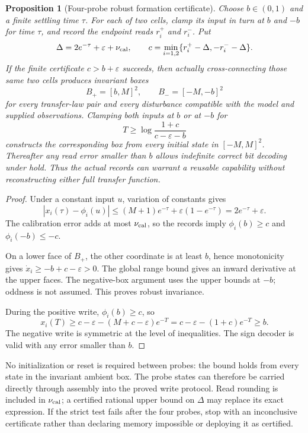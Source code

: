 \documentclass[11pt]{article}
\newtheorem{proposition}[theorem]{Proposition}
\theoremstyle{definition}
\theoremstyle{remark}
\begin{document}
\begin{proposition}[Four-probe robust formation certificate]\label{fb:prop:finite-probes}
Choose $b\in(0,1)$ and a finite settling time $\tau$. For each of two cells, clamp its input in turn at $b$ and $-b$ for time $\tau$, and record the endpoint reads $r_i^+$ and $r_i^-$. Put
\[
 \Delta=2e^{-\tau}+\varepsilon+\nu_{\rm cal},\qquad
 c=\min_{i=1,2}\{r_i^+-\Delta,-r_i^--\Delta\}.
\]
If the finite certificate $c>b+\varepsilon$ succeeds, then actually cross-connecting those same two cells produces invariant boxes
\[
 B_+=[b,M]^2,\qquad B_-=[-M,-b]^2
\]
for every transfer-law pair and every disturbance compatible with the model and supplied observations. Clamping both inputs at $b$ or at $-b$ for
\[
 T\geq\log\frac{1+c}{c-\varepsilon-b}
\]
constructs the corresponding box from every initial state in $[-M,M]^2$. Thereafter any read error smaller than $b$ allows indefinite correct bit decoding under hold. Thus the actual records can warrant a reusable capability without reconstructing either full transfer function.
\end{proposition}
\begin{proof}
Under a constant input $u$, variation of constants gives
\[
 |x_i(\tau)-\phi_i(u)|
 \leq (M+1)e^{-\tau}+\varepsilon(1-e^{-\tau})
 =2e^{-\tau}+\varepsilon.
\]
The calibration error adds at most $\nu_{\rm cal}$, so the records imply
$\phi_i(b)\geq c$ and $\phi_i(-b)\leq-c$.

On a lower face of $B_+$, the other coordinate is at least $b$, hence monotonicity gives
$\dot x_i\geq-b+c-\varepsilon>0$. The global range bound gives an inward derivative at the upper faces. The negative-box argument uses the upper bounds at $-b$; oddness is not assumed. This proves robust invariance.

During the positive write, $\phi_i(b)\geq c$, so
\[
 x_i(T)\geq c-\varepsilon-(M+c-\varepsilon)e^{-T}
 =c-\varepsilon-(1+c)e^{-T}\geq b.
\]
The negative write is symmetric at the level of inequalities. The sign decoder is valid with any error smaller than $b$.
\end{proof}

No initialization or reset is required between probes: the bound holds from every state in the invariant ambient box. The probe states can therefore be carried directly through assembly into the proved write protocol. Read rounding is included in $\nu_{\rm cal}$; a certified rational upper bound on $\Delta$ may replace its exact expression. If the strict test fails after the four probes, stop with an inconclusive certificate rather than declaring memory impossible or deploying it as certified.
\end{document}
